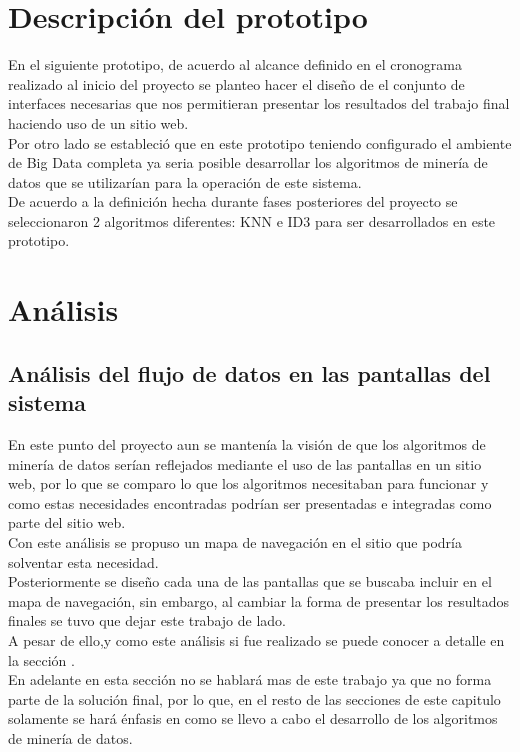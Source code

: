 \section{Descripción del prototipo}
En el siguiente prototipo, de acuerdo al alcance definido en el cronograma realizado al inicio del proyecto se planteo hacer el diseño de el conjunto de interfaces necesarias que nos permitieran presentar los resultados del trabajo final haciendo uso de un sitio web.
\\
Por otro lado se estableció que en este prototipo teniendo configurado el ambiente de Big Data completa ya seria posible  desarrollar los algoritmos de minería de datos que se utilizarían para la operación de este sistema.
\\
De acuerdo a la definición hecha durante fases posteriores del proyecto se seleccionaron 2 algoritmos diferentes: KNN e ID3 para ser desarrollados en este prototipo.
\section{Análisis}
\subsection{Análisis del flujo de datos en las pantallas del sistema}
En este punto del proyecto aun se mantenía la visión de que los algoritmos de minería de datos serían reflejados mediante el uso de las pantallas en un sitio web, por lo que se comparo lo que los algoritmos necesitaban para funcionar y como estas necesidades encontradas podrían ser presentadas e integradas como parte del sitio web. \\
Con este análisis se propuso un mapa de navegación en el sitio que podría solventar esta necesidad. \\
Posteriormente se diseño cada una de las pantallas que se buscaba incluir en el mapa de navegación, sin embargo, al cambiar la forma de presentar los resultados finales se tuvo que dejar este trabajo de lado. \\
A pesar de ello,y como este análisis si fue realizado se puede conocer a detalle en la sección .\\
En adelante en esta sección no se hablará mas de este trabajo ya que no forma parte de la solución final, por lo que, en el resto de las secciones de este capitulo solamente se hará énfasis en como se llevo a cabo el desarrollo de los algoritmos de minería de datos. 
